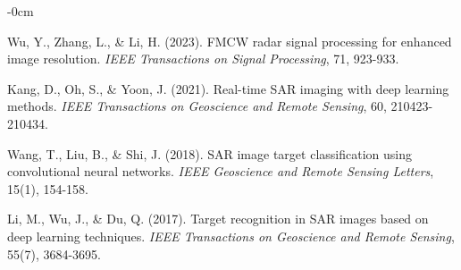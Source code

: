 \documentclass[journal,article,submit,pdftex,moreauthors]{Definitions/mdpi}
\begin{document}
\begin{adjustwidth}{-\extralength}{0cm}
\begin{thebibliography}{999}
 Wu, Y., Zhang, L., \& Li, H. (2023). FMCW radar signal processing for enhanced image resolution. \textit{IEEE Transactions on Signal Processing}, 71, 923-933.

 Kang, D., Oh, S., \& Yoon, J. (2021). Real-time SAR imaging with deep learning methods. \textit{IEEE Transactions on Geoscience and Remote Sensing}, 60, 210423-210434.


 Wang, T., Liu, B., \& Shi, J. (2018). SAR image target classification using convolutional neural networks. \textit{IEEE Geoscience and Remote Sensing Letters}, 15(1), 154-158.

 Li, M., Wu, J., \& Du, Q. (2017). Target recognition in SAR images based on deep learning techniques. \textit{IEEE Transactions on Geoscience and Remote Sensing}, 55(7), 3684-3695.
\end{thebibliography}

%



%


\PublishersNote{}
\end{adjustwidth}
\end{document}
